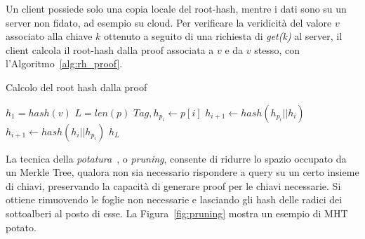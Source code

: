 Un client possiede solo una copia locale del root-hash, mentre i dati sono su un server non fidato, ad esempio su cloud. Per verificare la veridicità del valore $v$ associato alla chiave $k$ ottenuto a seguito di una richiesta di \emph{get(k)} al server, il client calcola il root-hash dalla proof associata a $v$ e da $v$ stesso, con l'Algoritmo~\ref{alg:rh_proof}.

\begin{algorithm}[h]
	\caption{Calcolo del root hash dalla proof}
	\begin{algorithmic}
			\State $h_1 = hash(v)$
			\State $L = len(p)$
				\State $Tag, h_{p_i} \leftarrow p[i]$
					\State $h_{i+1} \leftarrow hash(h_{p_i} || h_i)$
				\Else
					\State $h_{i+1} \leftarrow hash(h_i || h_{p_i})$				
				\EndIf
			\EndFor
			\Return $h_L$
		\EndProcedure
	\end{algorithmic}
	\label{alg:rh_proof}
\end{algorithm}

La tecnica della \emph{potatura}~\cite{ponnapalli2019scalable}, o \emph{pruning}, consente di ridurre lo spazio occupato da un Merkle Tree, qualora non sia necessario rispondere a query su un certo insieme di chiavi, preservando la capacità di generare proof per le chiavi necessarie. Si ottiene rimuovendo le foglie non necessarie e lasciando gli hash delle radici dei sottoalberi al posto di esse. La Figura~\ref{fig:pruning} mostra un esempio di MHT potato.

